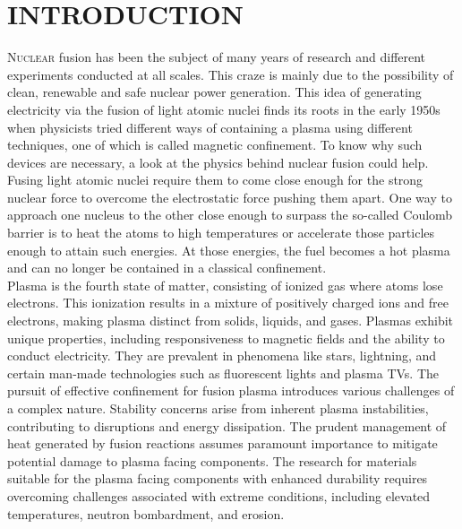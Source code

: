 \chapter{INTRODUCTION}
\lettrine[lines=3, lhang=0.33, loversize=0.25]{N}{uclear} \normalsize{fusion has been the subject of many years of research and different experiments conducted at all scales. This craze is mainly due to the possibility of clean, renewable and safe nuclear power generation. This idea of generating electricity via the fusion of light atomic nuclei finds its roots in the early 1950s when physicists tried different ways of containing a plasma using different techniques, one of which is called magnetic confinement. To know why such devices are necessary, a look at the physics behind nuclear fusion could help. Fusing light atomic nuclei require them to come close enough for the strong nuclear force to overcome the electrostatic force pushing them apart. One way to approach one nucleus to the other close enough to surpass the so-called Coulomb barrier is to heat the atoms to high temperatures or accelerate those particles enough to attain such energies. At those energies, the fuel becomes a hot plasma and can no longer be contained in a classical confinement.}
\\
\break
\normalsize{\indent Plasma is the fourth state of matter, consisting of ionized gas where atoms lose electrons. This ionization results in a mixture of positively charged ions and free electrons, making plasma distinct from solids, liquids, and gases. Plasmas exhibit unique properties, including responsiveness to magnetic fields and the ability to conduct electricity. They are prevalent in phenomena like stars, lightning, and certain man-made technologies such as fluorescent lights and plasma TVs. The pursuit of effective confinement for fusion plasma introduces various challenges of a complex nature. Stability concerns arise from inherent plasma instabilities, contributing to disruptions and energy dissipation. The prudent management of heat generated by fusion reactions assumes paramount importance to mitigate potential damage to plasma facing components. The research for materials suitable for the plasma facing components with enhanced durability requires overcoming challenges associated with extreme conditions, including elevated temperatures, neutron bombardment, and erosion.}
\\
\break
